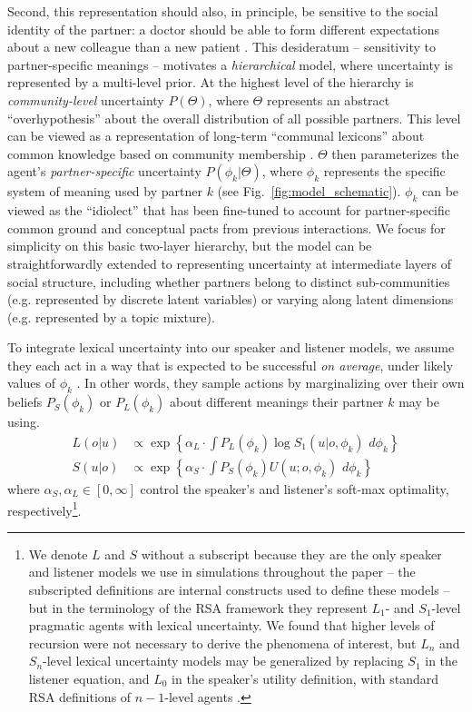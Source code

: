 Second, this representation should also, in principle, be sensitive to the social identity of the partner: a doctor should be able to form different expectations about a new colleague than a new patient \cite{clark_communal_1998}.
This desideratum -- sensitivity to partner-specific meanings -- motivates a \emph{hierarchical} model, where uncertainty is represented by a multi-level prior. 
At the highest level of the hierarchy is \emph{community-level} uncertainty $P(\Theta)$, where $\Theta$ represents an abstract ``overhypothesis'' about the overall distribution of all possible partners. 
This level can be viewed as a representation of long-term ``communal lexicons'' about common knowledge based on community membership \cite{ClarkMarshall1981}. 
$\Theta$ then parameterizes the agent's \emph{partner-specific} uncertainty $P(\phi_{k} | \Theta)$, where $\phi_k$ represents the specific system of meaning used by partner $k$ (see Fig.~\ref{fig:model_schematic}). 
$\phi_k$ can be viewed as the ``idiolect'' that has been fine-tuned to account for partner-specific common ground and conceptual pacts from previous interactions.
We focus for simplicity on this basic two-layer hierarchy, but the model can be straightforwardly extended to representing uncertainty at intermediate layers of social structure, including whether partners belong to distinct sub-communities (e.g. represented by discrete latent variables) or varying along latent dimensions (e.g. represented by a topic mixture). 

To integrate lexical uncertainty into our speaker and listener models, we assume they each act in a way that is expected to be successful \emph{on average}, under likely values of $\phi_k$ \cite{SmithGoodmanFrank13_RecursivePragmaticReasoningNIPS}.
In other words, they sample actions by marginalizing over their own beliefs $P_S(\phi_k)$ or $P_L(\phi_k)$ about different meanings their partner $k$ may be using.
\begin{align}
L(o|u) &\propto   \exp\left\{\alpha_L\cdot \textstyle{\int} P_L(\phi_k)  \log S_1(u|o, \phi_k)\,\,d\phi_k\right\}\nonumber\\
S(u|o) &\propto  \exp\left\{\alpha_S \cdot \textstyle{\int} P_S(\phi_k)  U(u; o, \phi_k) \,\,d\phi_k\right\}\label{eq:marginalized}
\end{align}
where $\alpha_S, \alpha_L \in[0,\infty]$ control the speaker's and listener's soft-max optimality, respectively\footnote{We denote $L$ and $S$ without a subscript because they are the only speaker and listener models we use in simulations throughout the paper -- the subscripted definitions are internal constructs used to define these models -- but in the terminology of the RSA framework they represent $L_1$- and $S_1$-level pragmatic agents with lexical uncertainty. We found that higher levels of recursion were not  necessary to derive the phenomena of interest, but $L_n$ and $S_n$-level lexical uncertainty models may be generalized by replacing $S_1$ in the listener equation, and $L_0$ in the speaker's utility definition, with standard RSA definitions of $n-1$-level agents \cite<see also>{zaslavsky2020rate}.}.

